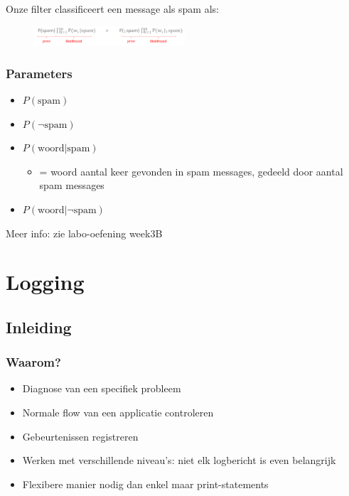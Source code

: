 \documentclass{article}
\begin{document}
Onze filter classificeert een message als spam als:

\begin{figure}[H]
    \centering
    \includegraphics[width=0.5\textwidth]{bayes-spam2.png}
\end{figure}

\subsubsection{Parameters}

\begin{itemize}
    \item $P(\text{spam})$
    \item $P(\neg \text{spam})$
    \item $P(\text{woord}|\text{spam})$
    \begin{itemize}
        \item = woord aantal keer gevonden in spam messages, gedeeld door aantal spam messages
    \end{itemize}
    \item $P(\text{woord}|\neg \text{spam})$
\end{itemize}

Meer info: zie labo-oefening week3B


\section{Logging}

\subsection{Inleiding}

\subsubsection{Waarom?}

\begin{itemize}
    \item Diagnose van een specifiek probleem
    \item Normale flow van een applicatie controleren
    \item Gebeurtenissen registreren
    \item Werken met verschillende niveau's: niet elk logbericht is even belangrijk
    \item Flexibere manier nodig dan enkel maar print-statements
\end{itemize}
\end{document}
